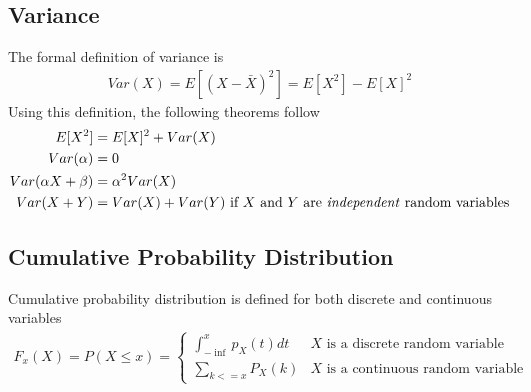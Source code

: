 \documentclass[../probability-notes.tex]{subfiles}
\begin{document}
    \subsection{Variance}
    The formal definition of variance is
    \begin{align*}
        Var(X) = E[(X - \bar{X})^{2}] = E[X^{2}] - E[X]^{2}
    \end{align*}
    Using this definition, the following theorems follow
    \begin{align*}
        E[X^{2}] &= E[X]^{2} + Var(X) \\
        Var(\alpha) &= 0 \\
        Var(\alpha X + \beta) &= \alpha^{2} Var(X) \\
        Var(X + Y) &= Var(X) + Var(Y) \text{  if $X$ and $Y$ are \emph{independent} random variables}
    \end{align*}

    \subsection{Cumulative Probability Distribution}
    Cumulative probability distribution is defined for both discrete and continuous variables
    \begin{align*}
        F_{x}(X) = P(X \leq x) = \begin{cases} \int_{-\inf}^{x} p_{X}(t) dt &\mbox{$X$ is a discrete random variable}\\
                                               \sum_{k <= x} P_{X}(k) &\mbox{$X$ is a continuous random variable} \end{cases}
    \end{align*}
\end{document}
